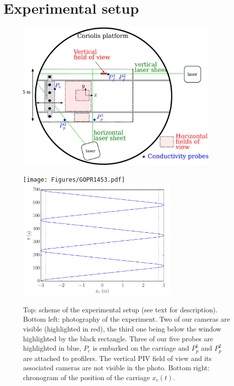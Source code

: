 \documentclass[a4paper, 12pt, times]{article}
\begin{document}
\section{Experimental setup}

\begin{figure}[htb]
\centerline{
\includegraphics[width=10cm]{Figures/scheme_exp_grid_MILESTONE_Euhit.pdf}}
\vspace{5mm}
\centerline{
\texttt{[image: Figures/GOPR1453.pdf]}
\includegraphics[width=80mm]{Figures/fig_movement_carriage.pdf}}
\caption{Top: scheme of the experimental setup (see text for
description). Bottom left: photography of the experiment. Two of our cameras
are visible (highlighted in red), the third one being below the window
highlighted by the black rectangle. Three of our five probes are highlighted in
blue, $P_c$ is embarked on the carriage and $P_p^1$ and $P_p^2$ are attached to
profilers. The vertical PIV field of view and its associated cameras are not
visible in the photo. Bottom right: chronogram of the position of the carriage
$x_c(t)$.}
\label{fig:exp}
\end{figure}
\end{document}
